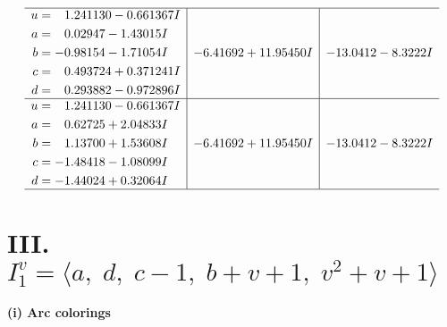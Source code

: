 \documentclass[1p]{elsarticle_modified}
\theoremstyle{definition}
\begin{document}
$$\begin{array}{c|c|c}
 \hline 
\begin{aligned}
u &= \phantom{-}1.241130 - 0.661367 I \\
a &= \phantom{-}0.02947 - 1.43015 I \\
b &= -0.98154 - 1.71054 I \\
c &= \phantom{-}0.493724 + 0.371241 I \\
d &= \phantom{-}0.293882 - 0.972896 I\end{aligned}
 & -6.41692 + 11.95450 I & -13.0412 - 8.3222 I \\ \hline\begin{aligned}
u &= \phantom{-}1.241130 - 0.661367 I \\
a &= \phantom{-}0.62725 + 2.04833 I \\
b &= \phantom{-}1.13700 + 1.53608 I \\
c &= -1.48418 - 1.08099 I \\
d &= -1.44024 + 0.32064 I\end{aligned}
 & -6.41692 + 11.95450 I & -13.0412 - 8.3222 I\\
 \hline 
 \end{array}$$\newpage\newpage\renewcommand{\arraystretch}{1}
\centering \section*{III. $I^v_{1}= \langle a,\;d,\;c-1,\;b+v+1,\;v^2+v+1 \rangle$}
\flushleft \textbf{(i) Arc colorings}\\
\end{document}
